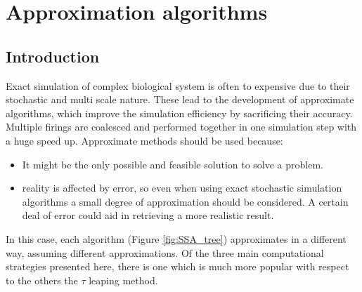 \graphicspath{{chapters/04/images/}}
\chapter{Approximation algorithms}

\section{Introduction}
Exact simulation of complex biological system is often to expensive due to their stochastic and multi scale nature.
These lead to the development of approximate algorithms, which improve the simulation efficiency by sacrificing their accuracy.
Multiple firings are coalesced and performed together in one simulation step with a huge speed up.
Approximate methods should be used because:

\begin{multicols}{2}
  \begin{itemize}
    \item It might be the only possible and feasible solution to solve a problem.
    \item reality is affected by error, so even when using exact stochastic simulation algorithms a small degree of approximation should be considered.
      A certain deal of error could aid in retrieving a more realistic result.
  \end{itemize}
\end{multicols}

In this case, each algorithm (Figure \ref{fig:SSA_tree}) approximates in a different way,  assuming different approximations.
Of the three main computational strategies presented here, there is one which is much more popular with respect to the others the $\tau$ leaping method.

